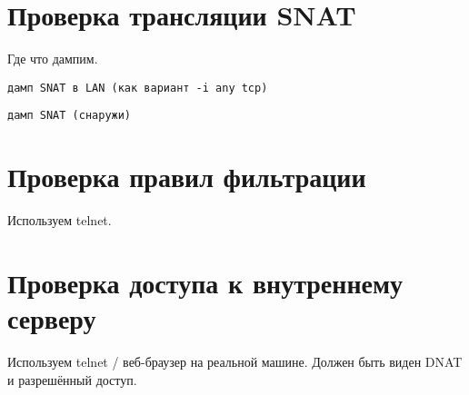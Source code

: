 \documentclass[a4paper,12pt]{article}
\begin{document}
\section{Проверка трансляции SNAT}

Где что дампим.

\begin{Verbatim}
дамп SNAT в LAN (как вариант -i any tcp)
\end{Verbatim}

\begin{Verbatim}
дамп SNAT (снаружи)
\end{Verbatim}


\section{Проверка правил фильтрации}

Используем telnet.

\section{Проверка доступа к внутреннему серверу}

Используем telnet / веб-браузер на реальной машине. 
Должен быть виден DNAT и разрешённый доступ.
\end{document}
